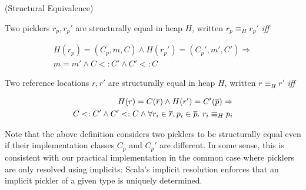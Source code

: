 \begin{defn}(Structural Equivalence)

Two picklers $r_p,r_p'$ are structurally equal in heap $H$, written $r_p \equiv_{H} r_p'$
{\em iff}

\begin{equation}
\begin{split}
H(r_p) = (C_p, m, C) \land H(r_p') = (C_p', m', C') \Rightarrow \\
m = m' \land C <: C' \land C' <: C
\end{split}
\end{equation}

Two reference locations $r,r'$ are structurally equal in heap $H$, written $r \equiv_{H} r'$ {\em iff}

\begin{equation}
\begin{split}
H(r) = C(\overline{r}) \land H(r') = C'(\overline{p}) \Rightarrow \\
C <: C' \land C' <: C \land \forall r_i \in \overline{r}, p_i \in \overline{p}.~r_i \equiv_{H} p_i
\end{split}
\end{equation}

\end{defn}

Note that the above definition considers two picklers to be structurally equal
even if their implementation classes $C_p$ and $C_p'$ are different. In some
sense, this is consistent with our practical implementation in the common case
where picklers are only resolved using implicits: Scala's implicit resolution
enforces that an implicit pickler of a given type is uniquely determined.














